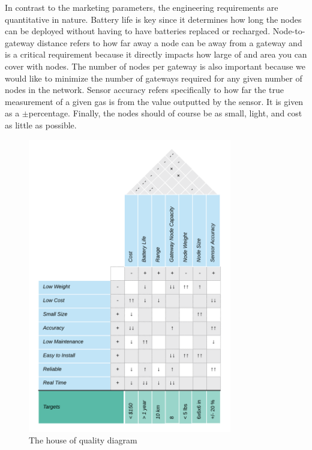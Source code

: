 In contrast to the marketing parameters, the engineering requirements are
quantitative in nature. Battery life is key since it determines how long the
nodes can be deployed without having to have batteries replaced or recharged.
Node-to-gateway distance refers to how far away a node can be away from a
gateway and is a critical requirement because it directly impacts how large of
and area you can cover with nodes. The number of nodes per gateway is also
important because we would like to minimize the number of gateways required for
any given number of nodes in the network. Sensor accuracy refers specifically to
how far the true measurement of a given gas is from the value outputted by the
sensor. It is given as a $\pm$percentage. Finally, the nodes should of course be
as small, light, and cost as little as possible.

\begin{figure}[H]
    \centering
    \includegraphics[width=3.5in]{./figures/hoq.png} 
    \caption{The house of quality diagram}
    \label{fig:hoq}
\end{figure}

